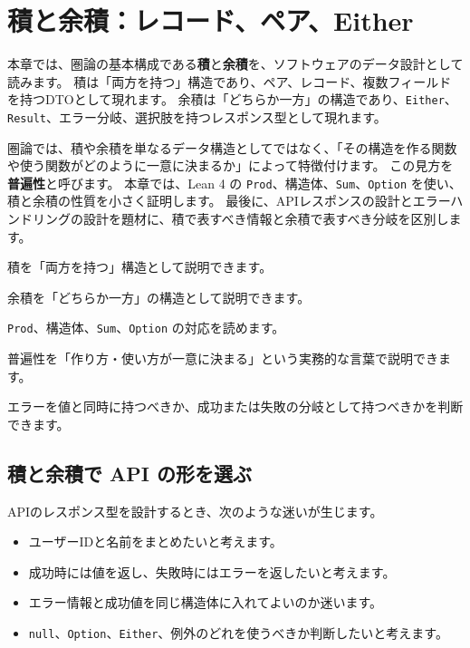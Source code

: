 \chapter{積と余積：レコード、ペア、Either}
\label{chap:products-coproducts}

\begin{chapterabstract}
本章では、圏論の基本構成である\textbf{積}と\textbf{余積}を、ソフトウェアのデータ設計として読みます。
積は「両方を持つ」構造であり、ペア、レコード、複数フィールドを持つDTOとして現れます。
余積は「どちらか一方」の構造であり、\texttt{Either}、\texttt{Result}、エラー分岐、選択肢を持つレスポンス型として現れます。

圏論では、積や余積を単なるデータ構造としてではなく、「その構造を作る関数や使う関数がどのように一意に決まるか」によって特徴付けます。
この見方を\textbf{普遍性}と呼びます。
本章では、Lean 4 の \texttt{Prod}、構造体、\texttt{Sum}、\texttt{Option} を使い、積と余積の性質を小さく証明します。
最後に、APIレスポンスの設計とエラーハンドリングの設計を題材に、積で表すべき情報と余積で表すべき分岐を区別します。
\end{chapterabstract}

\begin{learninggoals}
\item 積を「両方を持つ」構造として説明できます。
\item 余積を「どちらか一方」の構造として説明できます。
\item \texttt{Prod}、構造体、\texttt{Sum}、\texttt{Option} の対応を読めます。
\item 普遍性を「作り方・使い方が一意に決まる」という実務的な言葉で説明できます。
\item エラーを値と同時に持つべきか、成功または失敗の分岐として持つべきかを判断できます。
\end{learninggoals}

\section{積と余積で API の形を選ぶ}

APIのレスポンス型を設計するとき、次のような迷いが生じます。

\begin{itemize}
\item ユーザーIDと名前をまとめたいと考えます。
\item 成功時には値を返し、失敗時にはエラーを返したいと考えます。
\item エラー情報と成功値を同じ構造体に入れてよいのか迷います。
\item \texttt{null}、\texttt{Option}、\texttt{Either}、例外のどれを使うべきか判断したいと考えます。
\end{itemize}

